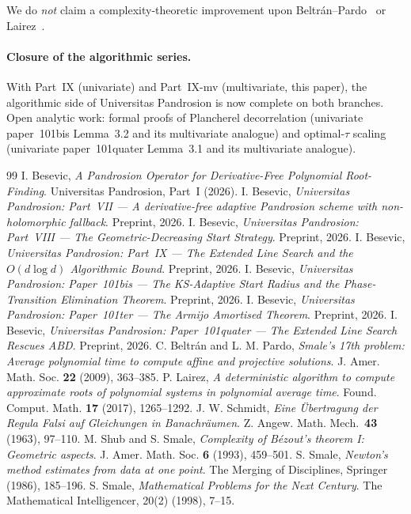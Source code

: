 \documentclass[11pt,a4paper]{article}
\begin{document}
We do \emph{not} claim a complexity-theoretic improvement upon Beltr\'an--Pardo~\cite{beltranpardo} or Lairez~\cite{lairez}.

\paragraph{Closure of the algorithmic series.} With Part~IX (univariate) and Part~IX-mv (multivariate, this paper), the algorithmic side of Universitas Pandrosion is now complete on both branches. Open analytic work: formal proofs of Plancherel decorrelation (univariate paper~101bis Lemma~3.2 and its multivariate analogue) and optimal-$\tau$ scaling (univariate paper~101quater Lemma~3.1 and its multivariate analogue).

\begin{thebibliography}{99}
 I. Besevic, \textit{A Pandrosion Operator for Derivative-Free Polynomial Root-Finding}. Universitas Pandrosion, Part~I (2026).
 I. Besevic, \textit{Universitas Pandrosion: Part~VII --- A derivative-free adaptive Pandrosion scheme with non-holomorphic fallback}. Preprint, 2026.
 I. Besevic, \textit{Universitas Pandrosion: Part~VIII --- The Geometric-Decreasing Start Strategy}. Preprint, 2026.
 I. Besevic, \textit{Universitas Pandrosion: Part~IX --- The Extended Line Search and the $O(d\log d)$ Algorithmic Bound}. Preprint, 2026.
 I. Besevic, \textit{Universitas Pandrosion: Paper~101bis --- The KS-Adaptive Start Radius and the Phase-Transition Elimination Theorem}. Preprint, 2026.
 I. Besevic, \textit{Universitas Pandrosion: Paper~101ter --- The Armijo Amortised Theorem}. Preprint, 2026.
 I. Besevic, \textit{Universitas Pandrosion: Paper~101quater --- The Extended Line Search Rescues ABD}. Preprint, 2026.
 C. Beltr\'an and L. M. Pardo, \textit{Smale's 17th problem: Average polynomial time to compute affine and projective solutions}. J. Amer. Math. Soc. \textbf{22} (2009), 363--385.
 P. Lairez, \textit{A deterministic algorithm to compute approximate roots of polynomial systems in polynomial average time}. Found. Comput. Math. \textbf{17} (2017), 1265--1292.
 J. W. Schmidt, \textit{Eine \"Ubertragung der Regula Falsi auf Gleichungen in Banachr\"aumen}. Z. Angew. Math. Mech.\ \textbf{43} (1963), 97--110.
 M. Shub and S. Smale, \textit{Complexity of B\'ezout's theorem I: Geometric aspects}. J. Amer. Math. Soc. \textbf{6} (1993), 459--501.
 S. Smale, \textit{Newton's method estimates from data at one point}. The Merging of Disciplines, Springer (1986), 185--196.
 S. Smale, \textit{Mathematical Problems for the Next Century}. The Mathematical Intelligencer, 20(2) (1998), 7--15.
\end{thebibliography}
\end{document}
